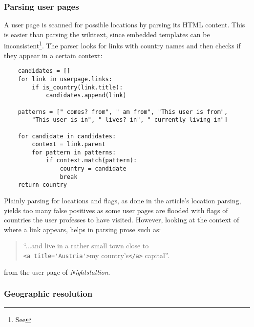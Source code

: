\subsubsection{Parsing user pages}\label{sub:parsinguserpages}

A user page is scanned for possible locations by parsing its \ac{HTML} content.
This is easier than parsing the wikitext, since embedded templates can be inconsistent\footnote{See }.
The parser looks for links with country names and then checks if they appear in a certain context:

\begin{lstlisting}
	candidates = []
	for link in userpage.links:
		if is_country(link.title):
			candidates.append(link)

	patterns = [" comes? from", " am from", "This user is from", 
		"This user is in", " lives? in", " currently living in"]
		
	for candidate in candidates:
		context = link.parent
		for pattern in patterns:
			if context.match(pattern):
				country = candidate
				break
	return country
\end{lstlisting}

Plainly parsing for locations and flags, as done in the article's location parsing, yields too many false positives as some user pages are flooded with flags of countries the user professes to have visited.
However, looking at the context of where a link appears, helps in parsing prose such as:
\begin{quotation}
 ``...and live in a rather small town close to \\\verb"<a title='Austria'>"my country's\verb"</a>" capital''.
\end{quotation}
from the user page of \emph{Nightstallion}.


\subsubsection{Geographic resolution}\label{sub:resolution}

